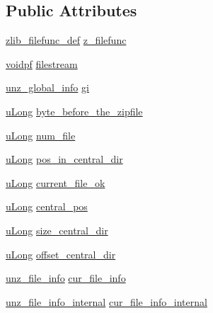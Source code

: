\subsection*{Public Attributes}
\begin{DoxyCompactItemize}
\item 
\hyperlink{ioapi_8h_a269f2bded66a7ee4052a60025afebd7e}{zlib\+\_\+filefunc\+\_\+def} \hyperlink{structunz__s_a7be6cd9deaecd46f98f462bf6594baf1}{z\+\_\+filefunc}
\item 
\hyperlink{ioapi_8h_a39ab6d73c1cd44bc17064c2dcbb3e753}{voidpf} \hyperlink{structunz__s_a40596bc73de7dacd226048d4334b5c78}{filestream}
\item 
\hyperlink{unzip_8h_a18c3b238618ea86ef503ecbd4092dbce}{unz\+\_\+global\+\_\+info} \hyperlink{structunz__s_a131303f89af11a26b53e99a58d6517cf}{gi}
\item 
\hyperlink{ioapi_8h_a50e9e9d5c30e481de822ad68fe537986}{u\+Long} \hyperlink{structunz__s_a788688a8021cbbba6a2ac1765edd362e}{byte\+\_\+before\+\_\+the\+\_\+zipfile}
\item 
\hyperlink{ioapi_8h_a50e9e9d5c30e481de822ad68fe537986}{u\+Long} \hyperlink{structunz__s_a737337b347bd5cc52bfabdcfbc11b853}{num\+\_\+file}
\item 
\hyperlink{ioapi_8h_a50e9e9d5c30e481de822ad68fe537986}{u\+Long} \hyperlink{structunz__s_a70f2901a7ba85573aa280bad826baf4a}{pos\+\_\+in\+\_\+central\+\_\+dir}
\item 
\hyperlink{ioapi_8h_a50e9e9d5c30e481de822ad68fe537986}{u\+Long} \hyperlink{structunz__s_abe2244ba62db8b3251634e26183f1c9a}{current\+\_\+file\+\_\+ok}
\item 
\hyperlink{ioapi_8h_a50e9e9d5c30e481de822ad68fe537986}{u\+Long} \hyperlink{structunz__s_a2d8ae4c0975d2057e30b13c3148c27eb}{central\+\_\+pos}
\item 
\hyperlink{ioapi_8h_a50e9e9d5c30e481de822ad68fe537986}{u\+Long} \hyperlink{structunz__s_a60b803a02e17ae46755cb94026ae973a}{size\+\_\+central\+\_\+dir}
\item 
\hyperlink{ioapi_8h_a50e9e9d5c30e481de822ad68fe537986}{u\+Long} \hyperlink{structunz__s_ac6c37ef70549769fa59bca623565d78f}{offset\+\_\+central\+\_\+dir}
\item 
\hyperlink{unzip_8h_a03b3ec1a8745daa96699ac49f193b177}{unz\+\_\+file\+\_\+info} \hyperlink{structunz__s_ab1963897ac959ca0f9b4208c573c2795}{cur\+\_\+file\+\_\+info}
\item 
\hyperlink{unzip_8c_a8f7400cb2fdf408412d6f75accea8305}{unz\+\_\+file\+\_\+info\+\_\+internal} \hyperlink{structunz__s_a36625697385b9a675f02a446fa5ba583}{cur\+\_\+file\+\_\+info\+\_\+internal}

\end{DoxyCompactItemize}
